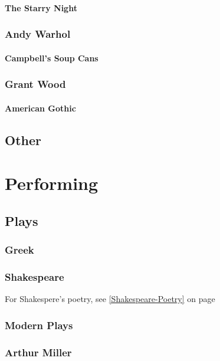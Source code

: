 				\paragraph{The Starry Night}
			\subsubsection{Andy Warhol}
				\paragraph{Campbell's Soup Cans}
			\subsubsection{Grant Wood}
				\paragraph{American Gothic}
				




			
			
		\subsection{Other}

	\section{Performing}
		\subsection{Plays}
			\subsubsection{Greek}
			\subsubsection{Shakespeare} \label{Shakespeare-Play} For Shakespere's poetry, see \ref{Shakespeare-Poetry} on page 
			\subsubsection{Modern Plays}
			\subsubsection{Arthur Miller}
			
